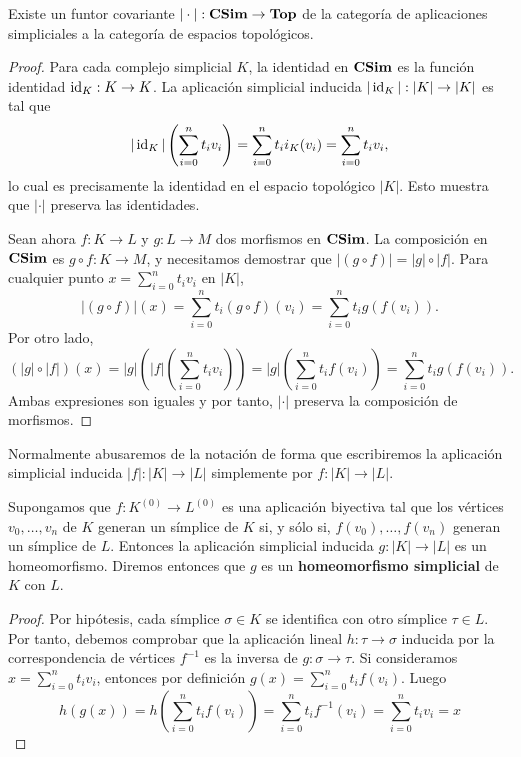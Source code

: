 \begin{proposicion}
	Existe un funtor covariante $|\cdot| : \mathbf{CSim}\to \mathbf{Top}$ de la categoría
	de aplicaciones simpliciales a la categoría de espacios topológicos.
\end{proposicion}
\begin{proof}
	Para cada complejo simplicial $K$, la identidad en $\mathbf{CSim}$ es la función
	identidad $\operatorname{id}_{K} : K \to K$. La aplicación simplicial inducida $|\operatorname{id}_{K}| : |
	K| \to |K|$ es tal que
	\[
	|\operatorname{id}_{K}|\left(\sum_{i=0}^{n}t_{i} v_{i}\right) = \sum_{i=0}^{n}t_{i} i_{K}(v
	_{i}) = \sum_{i=0}^{n}t_{i} v_{i},
	\]
	lo cual es precisamente la identidad en el espacio topológico $|K|$. Esto
	muestra que $|\cdot|$ preserva las identidades.
	
	Sean ahora $f: K \to L$ y $g: L \to M$ dos morfismos en $\mathbf{CSim}$. La composición
	en $\mathbf{CSim}$ es $g \circ f: K \to M$, y necesitamos demostrar que
	$|(g \circ f)| = |g| \circ |f|$. Para cualquier punto $x = \sum_{i=0}^{n}t_{i}
	v_{i}$ en $|K|$,
	\[
	|(g \circ f)|(x) = \sum_{i=0}^{n}t_{i} (g \circ f)(v_{i}) = \sum_{i=0}^{n}t_{i}
	g(f(v_{i})).
	\]
	Por otro lado,
	\[
	(|g| \circ |f|)(x) = |g|\left(|f|\left(\sum_{i=0}^{n}t_{i} v_{i}\right)\right
	) = |g|\left(\sum_{i=0}^{n}t_{i} f(v_{i})\right) = \sum_{i=0}^{n}t_{i} g(f(v_{i}
	)).
	\]
	Ambas expresiones son iguales y por tanto, $|\cdot|$ preserva la composición
	de morfismos.
\end{proof}

Normalmente abusaremos de la notación de forma que escribiremos la aplicación simplicial inducida $|f| : |K| \to |L|$ simplemente por $f : |K| \to |L|$.

\begin{lema}
	\label{lem:homeo_complex} Supongamos que $f:K^{(0)}\rightarrow L^{(0)}$ es una
	aplicación biyectiva tal que los vértices $v_{0}, \ldots, v_{n}$ de $K$ generan
	un símplice de $K$ si, y sólo si, $f(v_{0}), \ldots, f(v_{n})$ generan un símplice
	de $L$. Entonces la aplicación simplicial inducida $g:|K| \rightarrow |L|$ es
	un homeomorfismo. Diremos entonces que $g$ es un \textbf{homeomorfismo
		simplicial} de $K$ con $L$.
\end{lema}
\begin{proof}
	Por hipótesis, cada símplice $\sigma \in K$ se identifica con otro símplice
	$\tau \in L$. Por tanto, debemos comprobar que la aplicación lineal
	$h: \tau \rightarrow \sigma$ inducida por la correspondencia de vértices
	$f^{-1}$ es la inversa de $g: \sigma \rightarrow \tau$. Si consideramos $x = \sum
	_{i=0}^{n}t_{i}v_{i}$, entonces por definición
	$g(x) = \sum_{i=0}^{n}t_{i}f(v_{i})$. Luego
	\[
	h(g(x)) = h(\sum_{i=0}^{n}t_{i}f(v_{i})) = \sum_{i=0}^{n}t_{i}f^{-1}(v_{i}) =
	\sum_{i=0}^{n}t_{i}v_{i}= x
	\]
\end{proof}

